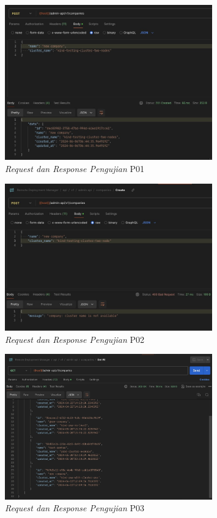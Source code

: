 \begin{figure}[ht]
  \centering
  \includegraphics[width=0.8\textwidth]{resources/chapter-4/pengujian/p01.jpg}
  \caption{\textit{Request dan Response Pengujian} P01}
  \label{fig:pengujian-p01}
\end{figure}

\begin{figure}[ht]
  \centering
  \includegraphics[width=0.8\textwidth]{resources/chapter-4/pengujian/p02.jpg}
  \caption{\textit{Request dan Response Pengujian} P02}
  \label{fig:pengujian-p02}
\end{figure}

\begin{figure}[ht]
  \centering
  \includegraphics[width=0.8\textwidth]{resources/chapter-4/pengujian/p03.jpg}
  \caption{\textit{Request dan Response Pengujian} P03}
  \label{fig:pengujian-p03}
\end{figure}

